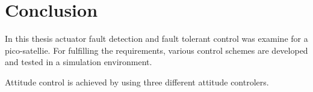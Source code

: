 \chapter{Conclusion}
In this thesis actuator fault detection and fault tolerant control was examine for a pico-satellie. For fulfilling the requirements, various control schemes are developed and tested in a simulation environment.

Attitude control is achieved by using three different attitude controlers. 

